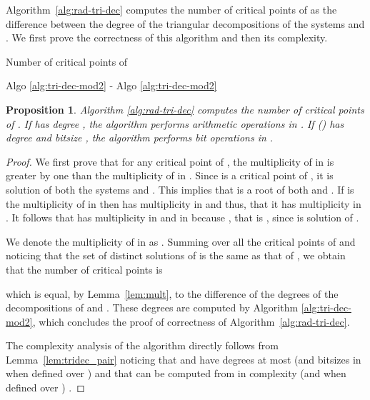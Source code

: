 \documentclass{sig-alternate}
\newtheorem{proposition}[theorem]{Proposition}
\begin{document}
\quad
Algorithm~\ref{alg:rad-tri-dec} computes the number of critical points of   as the difference between the
degree of the triangular decompositions of the systems  and . We first prove the correctness of this algorithm and then its complexity. 

\begin{algorithm}[t]
  \caption{Number of critical points of }
\label{alg:rad-tri-dec}
\begin{algorithmic}[1]

\smallskip
\RETURN  Algo \ref{alg:tri-dec-mod2}  - Algo \ref{alg:tri-dec-mod2}  


\end{algorithmic}
\end{algorithm}




\begin{proposition}\label{prop:proof-correctness}
  Algorithm \ref{alg:rad-tri-dec} computes the number of critical points of .
If  has degree , the algorithm performs  arithmetic
operations in . If 
 () has degree  and bitsize ,
the algorithm performs  bit 
operations in . 

\end{proposition}

\begin{proof}
We first prove that for any critical point  of , the multiplicity of  in
 is greater by one than the
multiplicity of  in   . 
Since  is a critical point of , it is  solution of both the systems  and . This implies that  is a root of both  and . If   is the multiplicity of  in  then  has multiplicity  in  and thus, that it has multiplicity  in . It follows that
 has multiplicity  in  and
 in  because , that is
, since
 is solution of .

We denote  the multiplicity of  in   as .
Summing 
over all the critical points of  and noticing that the set   of distinct solutions of  is the same as that of , we obtain that the number of critical points is

which is equal, by Lemma~\ref{lem:mult},  to the difference of the degrees of the decompositions of  and . These degrees are  computed by Algorithm \ref{alg:tri-dec-mod2}, which
  concludes the proof of correctness of Algorithm~\ref{alg:rad-tri-dec}.




The complexity analysis of the algorithm directly follows from Lemma~\ref{lem:tridec_pair} noticing that
 and  have degrees at most 
(and bitsizes in  when defined over ) and that  can be computed from
 in 
complexity  (and  when defined over ) \cite[Cor. 8.28]{vzGGer2}.
\end{proof}
\end{document}
